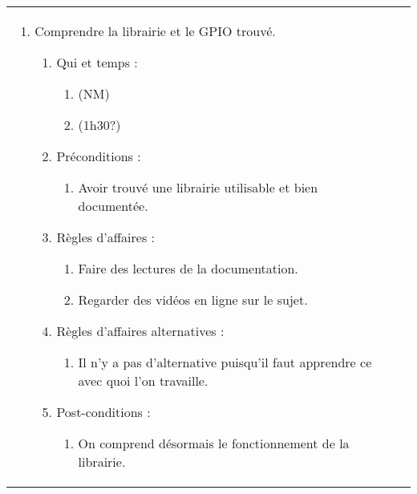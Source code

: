 \begin{longtable}{|l|p{}|}
\begin{enumerate}[label*=\arabic*.]
             \item Comprendre la librairie et le GPIO trouvé.
                \begin{enumerate}[label*=\arabic*.]
                                \item Qui et temps :
                                \begin{enumerate}[label*=\arabic*.]
                                    \item (NM)
                                    \item (1h30?)
                                \end{enumerate}
                                \item Préconditions :
                                \begin{enumerate}[label*=\arabic*.]
                                    \item Avoir trouvé une librairie utilisable et bien documentée.
                                \end{enumerate}
                                \item Règles d'affaires :
                                \begin{enumerate}[label*=\arabic*.]
                                    \item Faire des lectures de la documentation.
                                    \item Regarder des vidéos en ligne sur le sujet.
                                \end{enumerate}
                                \item Règles d'affaires alternatives :
                                \begin{enumerate}[label*=\arabic*.]
                                    \item Il n'y a pas d'alternative puisqu'il faut apprendre ce avec quoi l'on travaille.
                                \end{enumerate}
                                \item Post-conditions :
                                \begin{enumerate}[label*=\arabic*.]
                                    \item On comprend désormais le fonctionnement de la librairie.
                                \end{enumerate}
                            \end{enumerate}                

\end{enumerate}
\end{longtable}
